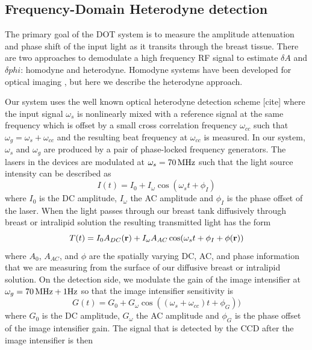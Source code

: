 \subsection{Frequency-Domain Heterodyne detection}
\label{sec:heterodyne}
The primary goal of the DOT system is to measure the amplitude attenuation and phase shift of the input light as it transits through the breast tissue. There are two approaches to demodulate a high frequency RF signal to estimate $\delta A$ and $\delta phi$: homodyne and heterodyne. Homodyne systems have been developed for optical imaging \cite{Troy1996,Sevick-Muraca1997,Godavarty2003}, but here we describe the heterodyne approach.

Our system uses the well known optical heterodyne detection scheme [cite] where the input signal $\omega_{s}$ is nonlinearly mixed with a reference signal at the same frequency which is offset by a small cross correlation frequency $\omega_{cc}$ such that $\omega_{g}=\omega_{s}+\omega_{cc}$ and the resulting beat frequency at $\omega_{cc}$ is measured.  In our system, $\omega_{s}$ and  $\omega_{g}$ are produced by a pair of phase-locked frequency generators. The lasers in the devices are modulated at $\omega_{s}=70\,{\rm MHz}$ such that the light source intensity can be described as
\begin{equation}
I(t) = I_{0} + I_{\omega}\cos(\omega_s t+\phi_I)
\end{equation}
where  $I_{0}$ is the DC amplitude, $I_{\omega}$ the AC amplitude and $\phi_I$ is the phase offset of the laser. When the light passes through our breast tank diffusively through breast or intralipid solution the resulting transmitted light has the form
\begin{equation}
T(t) = I_{0}A_{DC}({\bf r}) + I_{\omega}A_{AC}\cos(\omega_s t +\phi_I+ \phi({\bf r}))
\end{equation}
where $A_0$, $A_{AC}$, and $\phi$ are the spatially varying DC, AC, and phase information that we are measuring from the surface of our diffusive breast or intralipid solution. On the detection side, we modulate the gain of the image intensifier at $\omega_{g}=70\,{\rm MHz} + 1 {\rm Hz}$ so that the image intensifier sensitivity is
\begin{equation}
G(t) = G_{0} +G_{\omega} \cos((\omega_s+\omega_{cc})t+\phi_G))
\end{equation}
\noindent
where $G_{0}$ is the DC amplitude, $G_{\omega}$ the AC amplitude and $\phi_G$ is the phase offset of the image intensifier gain. The signal that is detected by the CCD after the image intensifier is then

